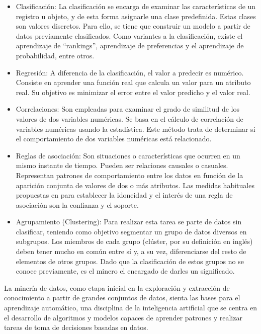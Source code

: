 \begin{itemize}
	\item Clasificación: La clasificación se encarga de examinar las características de un registro u objeto, y de esta forma asignarle una clase predefinida. Estas clases son valores discretos. Para ello, se tiene que construir un modelo a partir de datos previamente clasificados. Como variantes a la clasificación, existe el aprendizaje de “rankings”, aprendizaje de preferencias y el aprendizaje de probabilidad, entre otros. 
	\item Regresión: A diferencia de la clasificación, el valor a predecir es numérico. Consiste en aprender una función real que calcula un valor para un atributo real. Su objetivo es minimizar el error entre el valor predicho y el valor real.
	\item  Correlaciones: Son empleadas para examinar el grado de similitud de los valores de dos variables numéricas. Se basa en el cálculo de correlación de variables numéricas usando la estadística. Este método trata de determinar si el comportamiento de dos variables numéricas está relacionado.
	\item Reglas de asociación: Son situaciones o características que ocurren en un mismo instante de tiempo. Pueden ser relaciones causales o casuales. Representan patrones de comportamiento entre los datos en función de la aparición conjunta de valores de dos o más atributos. Las medidas habituales propuestas en \citep{Agrawal1519}	para establecer la idoneidad y el interés de una regla de asociación son la confianza y el soporte.
	\item	Agrupamiento (Clustering): Para realizar esta tarea se parte de datos sin clasificar, teniendo como objetivo segmentar un grupo de datos diversos en subgrupos. Los miembros de cada grupo (clúster, por su definición en inglés) deben tener mucho en común entre sí y, a su vez, diferenciarse del resto de elementos de otros grupos. Dado que la clasificación de estos grupos no se conoce previamente, es el minero el encargado de darles un significado.
\end{itemize}

La minería de datos, como etapa inicial en la exploración y extracción de conocimiento a partir de grandes conjuntos de datos, sienta las bases para el aprendizaje automático, una disciplina de la inteligencia artificial que se centra en el desarrollo de algoritmos y modelos capaces de aprender patrones y realizar tareas de toma de decisiones basadas en datos.


